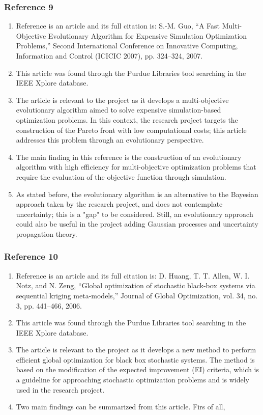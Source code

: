 \documentclass{journal}
\begin{document}
\subsubsection{Reference 9}
\begin{enumerate}
	\item Reference \cite{Guo2007} is an article and its full citation is: S.-M. Guo, “A Fast Multi-Objective Evolutionary Algorithm for Expensive Simulation Optimization Problems,” Second International Conference on Innovative Computing, Information and Control (ICICIC 2007), pp. 324–324, 2007.
	\item This article was found through the Purdue Libraries tool searching in the IEEE Xplore database.
	\item The article is relevant to the project as it develops a multi-objective evolutionary algorithm aimed to solve expensive simulation-based optimization problems. In this context, the research project targets the construction of the Pareto front with low computational costs; this article addresses this problem through an evolutionary perspective.
	\item The main finding in this reference is the construction of an evolutionary algorithm with high efficiency for multi-objective optimization problems that require the evaluation of the objective function through simulation.
	\item As stated before, the evolutionary algorithm is an alternative to the Bayesian approach taken by the research project, and does not contemplate uncertainty; this is a "gap" to be considered. Still, an evolutionary approach could also be useful in the project adding Gaussian processes and uncertainty propagation theory.
\end{enumerate}

\subsubsection{Reference 10}
\begin{enumerate}
	\item Reference \cite{Huang2006} is an article and its full citation is:  D. Huang, T. T. Allen, W. I. Notz, and N. Zeng, “Global optimization of stochastic black-box systems via sequential kriging meta-models,” Journal of Global Optimization, vol. 34, no. 3, pp. 441–466, 2006.
	\item This article was found through the Purdue Libraries tool searching in the IEEE Xplore database.
	\item The article is relevant to the project as it develops a new method to perform efficient global optimization for black box stochastic systems. The method is based on the modification of the expected improvement (EI) criteria, which is a guideline for approaching stochastic optimization problems and is widely used in the research project.
	\item Two main findings can be summarized from this article. Firs of all,  
\end{enumerate}
\end{document}

